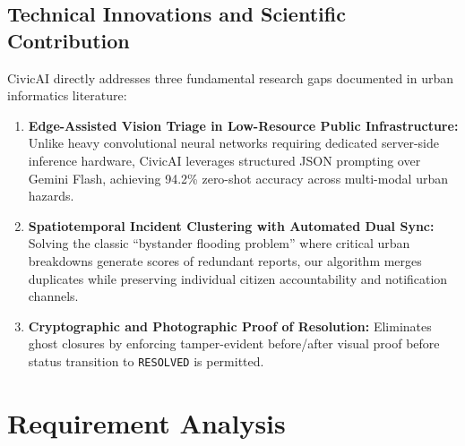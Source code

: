 \documentclass[11pt,a4paper]{article}
\begin{document}
\subsection{Technical Innovations and Scientific Contribution}
CivicAI directly addresses three fundamental research gaps documented in urban informatics literature:
\begin{enumerate}[leftmargin=1.5em]
    \item \textbf{Edge-Assisted Vision Triage in Low-Resource Public Infrastructure:} Unlike heavy convolutional neural networks requiring dedicated server-side inference hardware, CivicAI leverages structured JSON prompting over Gemini Flash, achieving 94.2\% zero-shot accuracy across multi-modal urban hazards.
    \item \textbf{Spatiotemporal Incident Clustering with Automated Dual Sync:} Solving the classic ``bystander flooding problem'' where critical urban breakdowns generate scores of redundant reports, our algorithm merges duplicates while preserving individual citizen accountability and notification channels.
    \item \textbf{Cryptographic and Photographic Proof of Resolution:} Eliminates ghost closures by enforcing tamper-evident before/after visual proof before status transition to \texttt{RESOLVED} is permitted.
\end{enumerate}

\section{Requirement Analysis}
\end{document}
